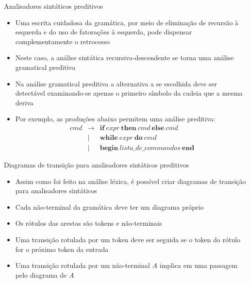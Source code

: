 \begin{frame}[fragile]{Analisadores sintáticos preditivos}

    \begin{itemize}
        \item Uma escrita cuidadosa da gramática, por meio de eliminação de recursão à esquerda e do uso de fatorações à esquerda, pode dispensar complementamente
            o retrocesso
        \pause

        \item Neste caso, a análise sintática recursiva-descendente se torna uma análise gramatical preditiva
        \pause

        \item Na análise gramatical preditiva a alternativa a se escolhida deve ser detectável examinando-se apenas o primeiro símbolo da cadeia que a mesma
            deriva
        \pause

        \item Por exemplo, as produções abaixo permitem uma análise preditiva:
        \[
            \begin{array}{rcl}
                cmd & \to & \textbf{if}\ expr\ \textbf{then}\ cmd\ \textbf{else}\ cmd \\
                & | & \textbf{while}\ expr\ \textbf{do}\ cmd \\
                & | & \textbf{begin}\ lista\_de\_commandos \ \textbf{end}
            \end{array}
        \]
    \end{itemize}

\end{frame}

\begin{frame}[fragile]{Diagramas de transição para analisadores sintáticos preditivos}

    \begin{itemize}
        \item Assim como foi feito na análise léxica, é possível criar diagramas de transição para analisadores sintáticos
        \pause

        \item Cada não-terminal da gramática deve ter um diagrama próprio
        \pause

        \item Os rótulos das arestas são tokens e não-terminais
        \pause

        \item Uma transição rotulada por um token deve ser seguida se o token do rótulo for o próximo token da entrada
        \pause

        \item Uma transição rotulada por um não-terminal $A$ implica em uma passagem pelo diagrama de $A$
    \end{itemize}

\end{frame}

